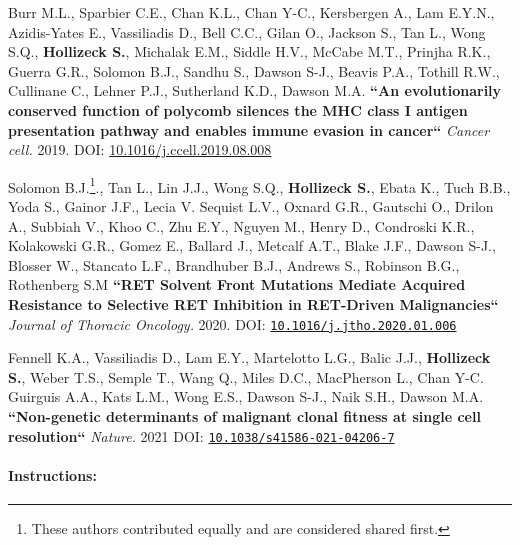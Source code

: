 {Burr M.L., Sparbier C.E., Chan K.L., Chan Y-C., Kersbergen A., Lam E.Y.N., Azidis-Yates E., Vassiliadis D., Bell C.C., Gilan O., Jackson S., Tan L., Wong S.Q., \textbf{Hollizeck S.}, Michalak E.M., Siddle H.V.,  McCabe M.T., Prinjha R.K., Guerra G.R., Solomon B.J., Sandhu S.,  Dawson S-J., Beavis P.A., Tothill R.W., Cullinane C., Lehner P.J., Sutherland K.D., Dawson M.A. \textbf{``An evolutionarily conserved function of polycomb silences the MHC class I antigen presentation pathway and enables immune evasion in cancer``} \textit{Cancer cell.} 2019. DOI: \href{https://doi.org/10.1016/j.ccell.2019.08.008}{10.1016/j.ccell.2019.08.008}

Solomon B.J.\footnote{These authors contributed equally and are considered shared first.}., Tan L.\footnotemark[\value{footnote}], Lin J.J.\footnotemark[\value{footnote}], Wong S.Q.\footnotemark[\value{footnote}], \textbf{Hollizeck S.}\footnotemark[\value{footnote}], Ebata K., Tuch B.B., Yoda S., Gainor J.F., Lecia V. Sequist L.V., Oxnard G.R., Gautschi O., Drilon A., Subbiah V., Khoo C., Zhu E.Y., Nguyen M., Henry D., Condroski K.R., Kolakowski G.R., Gomez E., Ballard J., Metcalf A.T., Blake J.F., Dawson S-J., Blosser W., Stancato L.F., Brandhuber B.J., Andrews S., Robinson B.G., Rothenberg S.M
\textbf{``RET Solvent Front Mutations Mediate Acquired Resistance to Selective RET Inhibition in RET-Driven Malignancies``}
\textit{Journal of Thoracic Oncology.} 2020. DOI: \href{https://doi.org/10.1016/j.jtho.2020.01.006}{\nolinkurl{10.1016/j.jtho.2020.01.006}}

Fennell K.A.\footnotemark[\value{footnote}], Vassiliadis D.\footnotemark[\value{footnote}], Lam E.Y., Martelotto L.G., Balic J.J., \textbf{Hollizeck S.}, Weber T.S., Semple T., Wang Q., Miles D.C., MacPherson L., Chan Y-C. Guirguis A.A., Kats L.M., Wong E.S., Dawson S-J., Naik S.H., Dawson M.A. \textbf{``Non-genetic determinants of malignant clonal fitness at single cell resolution``} \textit{Nature.} 2021 DOI: \href{https://doi.org/10.1038/s41586-021-04206-7}{\nolinkurl{10.1038/s41586-021-04206-7}}






\hrulefill

\paragraph{Instructions:}

}

